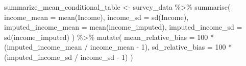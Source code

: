 \documentclass[
  spanish,
  11pt,
  letterpaper,
  oneside,
  open=any]{scrbook}
\newenvironment{Shaded}{\begin{snugshade}}{\end{snugshade}}
\newcommand{\AttributeTok}[1]{\textcolor[rgb]{0.40,0.45,0.13}{#1}}
\newcommand{\DecValTok}[1]{\textcolor[rgb]{0.68,0.00,0.00}{#1}}
\newcommand{\FunctionTok}[1]{\textcolor[rgb]{0.28,0.35,0.67}{#1}}
\newcommand{\NormalTok}[1]{\textcolor[rgb]{0.00,0.23,0.31}{#1}}
\newcommand{\OtherTok}[1]{\textcolor[rgb]{0.00,0.23,0.31}{#1}}
\newcommand{\SpecialCharTok}[1]{\textcolor[rgb]{0.37,0.37,0.37}{#1}}
\begin{document}
\begin{Shaded}
\begin{Highlighting}[]
\NormalTok{summarize\_mean\_conditional\_table }\OtherTok{\textless{}{-}}\NormalTok{ survey\_data }\SpecialCharTok{\%\textgreater{}\%}
  \FunctionTok{summarise}\NormalTok{(}
    \AttributeTok{income\_mean =} \FunctionTok{mean}\NormalTok{(Income),}
    \AttributeTok{income\_sd =} \FunctionTok{sd}\NormalTok{(Income),}
    \AttributeTok{imputed\_income\_mean =} \FunctionTok{mean}\NormalTok{(income\_imputed),}
    \AttributeTok{imputed\_income\_sd =} \FunctionTok{sd}\NormalTok{(income\_imputed)}
\NormalTok{  ) }\SpecialCharTok{\%\textgreater{}\%}
  \FunctionTok{mutate}\NormalTok{(}
    \AttributeTok{mean\_relative\_bias =} \DecValTok{100} \SpecialCharTok{*}\NormalTok{ (imputed\_income\_mean }\SpecialCharTok{/}\NormalTok{ income\_mean }\SpecialCharTok{{-}} \DecValTok{1}\NormalTok{),}
    \AttributeTok{sd\_relative\_bias =} \DecValTok{100} \SpecialCharTok{*}\NormalTok{ (imputed\_income\_sd }\SpecialCharTok{/}\NormalTok{ income\_sd }\SpecialCharTok{{-}} \DecValTok{1}\NormalTok{)}
\NormalTok{  )}
\end{Highlighting}
\end{Shaded}
\end{document}
